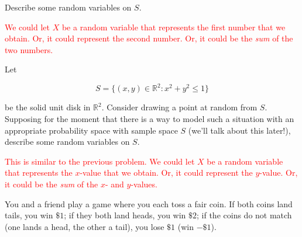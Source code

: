 \documentclass[12pt,reqno]{amsart}
\begin{document}
Describe some random variables on $S$.

\bigskip
\textcolor{red}{We could let $X$ be a random variable that represents the first number that we obtain. Or, it could represent the second number. Or, it could be the \textit{sum} of the two numbers.}
\bigskip























\bigskip
\prob Let

	\[
	S = \{ (x,y) \in \mathbb{R}^2 : x^2+y^2 \leq 1\}
	\]

be the solid unit disk in $\mathbb{R}^2$. Consider drawing a point at random from $S$. Supposing for the moment that there is a way to model such a situation with an appropriate probability space with sample space $S$ (we'll talk about this later!), describe some random variables on $S$.


\bigskip
\textcolor{red}{This is similar to the previous problem. We could let $X$ be a random variable that represents the $x$-value that we obtain. Or, it could represent the $y$-value. Or, it could be the \textit{sum} of the $x$- and $y$-values.}
\bigskip






















\bigskip
\prob You and a friend play a game where you each toss a fair coin. If both coins land tails, you win $\$1$; if they both land heads, you win $\$2$; if the coins do not match (one lands a head, the other a tail), you lose $\$1$ (win $-\$1$).
\end{document}
